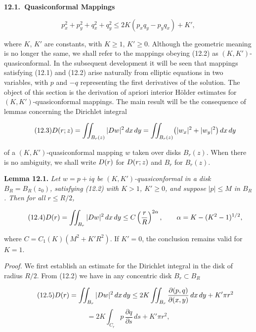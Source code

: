 
\setcounter{section}{11}
\noindent\textbf{12.1.\ Quasiconformal Mappings}

\begin{equation}\tag{12.2}
p_x^2+p_y^2+q_x^2+q_y^2\le 2K(p_xq_y-p_yq_x)+K',
\end{equation}

\noindent where $K$, $K'$ are constants, with $K\ge 1$, $K'\ge 0$. Although the geometric meaning
is no longer the same, we shall refer to the mappings obeying (12.2) as
$(K,K')$-quasiconformal. In the subsequent development it will be seen that
mappings satisfying (12.1) and (12.2) arise naturally from elliptic equations in
two variables, with $p$ and $-q$ representing the first derivatives of the solution.
The object of this section is the derivation of apriori interior H\"older estimates
for $(K,K')$-quasiconformal mappings. The main result will be the consequence of
lemmas concerning the Dirichlet integral

\begin{equation}\tag{12.3}
D(r;z)=\iint_{B_r(z)} |Dw|^2\,dx\,dy=\iint_{B_r(z)}\bigl(|w_x|^2+|w_y|^2\bigr)\,dx\,dy
\end{equation}

\noindent of a $(K,K')$-quasiconformal mapping $w$ taken over disks $B_r(z)$. When there is no
ambiguity, we shall write $D(r)$ for $D(r;z)$ and $B_r$ for $B_r(z)$.

\medskip
\noindent\textbf{Lemma 12.1.} \emph{Let $w=p+iq$ be $(K,K')$-quasiconformal in a disk $B_R=B_R(z_0)$,
satisfying (12.2) with $K>1$, $K'\ge 0$, and suppose $|p|\le M$ in $B_R$. Then for all $r\le R/2$,}

\begin{equation}\tag{12.4}
D(r)=\iint_{B_r}|Dw|^2\,dx\,dy\le C\left(\frac rR\right)^{2\alpha},
\qquad \alpha=K-(K^2-1)^{1/2},
\end{equation}

\noindent where $C=C_1(K)(M^2+K'R^2)$. If $K'=0$, the conclusion remains valid for $K=1$.

\medskip
\noindent\emph{Proof.} We first establish an estimate for the Dirichlet integral in the disk of radius
$R/2$. From (12.2) we have in any concentric disk $B_r\subset B_R$

\begin{equation}\tag{12.5}
D(r)=\iint_{B_r}|Dw|^2\,dx\,dy\le 2K\iint_{B_r}\frac{\partial(p,q)}{\partial(x,y)}\,dx\,dy+K'\pi r^2
\end{equation}
\[
=2K\int_{C_r}p\,\frac{\partial q}{\partial s}\,ds+K'\pi r^2,
\]


